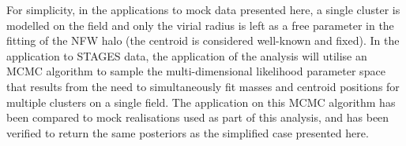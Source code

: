 \documentclass[useAMS,usenatbib,times,letter,amssymb]{mn2e}
\begin{document}
For simplicity, in the applications to mock data presented here, a single cluster is modelled on the field and only the virial radius is left as a free parameter in the fitting of the NFW halo (the centroid is considered well-known and fixed). In the application to STAGES data, the application of the analysis will utilise an MCMC algorithm to sample the multi-dimensional likelihood parameter space that results from the need to simultaneously fit masses and centroid positions for multiple clusters on a single field. The application on this MCMC algorithm has been compared to mock realisations used as part of this analysis, and has been verified to return the same posteriors as the simplified case presented here. %
\end{document}
